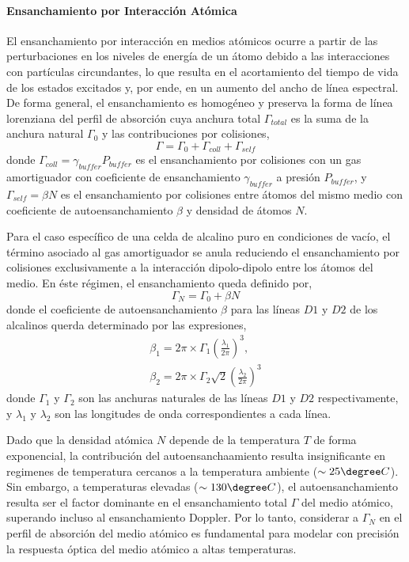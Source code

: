 \paragraph{Ensanchamiento por Interacción Atómica}
El ensanchamiento por interacción en medios atómicos ocurre a partir de las perturbaciones en los niveles de energía de un átomo debido a las interacciones con partículas circundantes, lo que resulta en el acortamiento del tiempo de vida de los estados excitados y, por ende, en un aumento del ancho de línea espectral. De forma general, el ensanchamiento es homogéneo y preserva la forma de línea lorenziana del perfil de absorción cuya anchura total $\Gamma_{total}$ es la suma de la anchura natural $\Gamma_0$ y las contribuciones por colisiones,
\begin{equation}
    \Gamma = \Gamma_0 + \Gamma_{coll} + \Gamma_{self}
\end{equation}
donde $\Gamma_{coll} = \gamma_{buffer} P_{buffer}$ es el ensanchamiento por colisiones con un gas amortiguador con coeficiente de ensanchamiento $\gamma_{buffer}$ a presión $P_{buffer}$, y $\Gamma_{self} = \beta N$ es el ensanchamiento por colisiones entre átomos del mismo medio con coeficiente de autoensanchamiento $\beta$ y densidad de átomos $N$.

Para el caso específico de una celda de alcalino puro en condiciones de vacío, el término asociado al gas amortiguador se anula reduciendo el ensanchamiento por colisiones exclusivamente a la interacción dipolo-dipolo entre los átomos del medio. En éste régimen, el ensanchamiento queda definido por,
\begin{equation}
    \Gamma_N = \Gamma_0 + \beta N
\end{equation}
donde el coeficiente de autoensanchamiento $\beta$ para las líneas $D1$ y $D2$ de los alcalinos querda determinado por las expresiones,
\begin{equation}
    \begin{split}
        \beta_1 = 2 \pi \times  \Gamma_1 \left( \frac{\lambda_1}{2 \pi}\right)^3, \\
        \beta_2 = 2 \pi \times \Gamma_2 \sqrt{2} \left( \frac{\lambda_2}{2 \pi}\right)^3
    \end{split}
\end{equation}
donde $\Gamma_1$ y $\Gamma_2$ son las anchuras naturales de las líneas $D1$ y $D2$ respectivamente, y $\lambda_1$ y $\lambda_2$ son las longitudes de onda correspondientes a cada línea. 

Dado  que la densidad atómica $N$ depende de la temperatura $T$ de forma exponencial, la contribución del autoensanchaamiento resulta insignificante en regimenes de temperatura cercanos a la temperatura ambiente ($\sim 25 \degree C$). Sin embargo, a temperaturas elevadas ($\sim 130 \degree C$), el autoensanchamiento resulta ser el factor dominante en el ensanchamiento total $\Gamma$ del medio atómico, superando incluso al ensanchamiento Doppler. Por lo tanto, considerar a $\Gamma_N$ en el perfil de absorción del medio atómico es fundamental para modelar con precisión la respuesta óptica del medio atómico a altas temperaturas.

